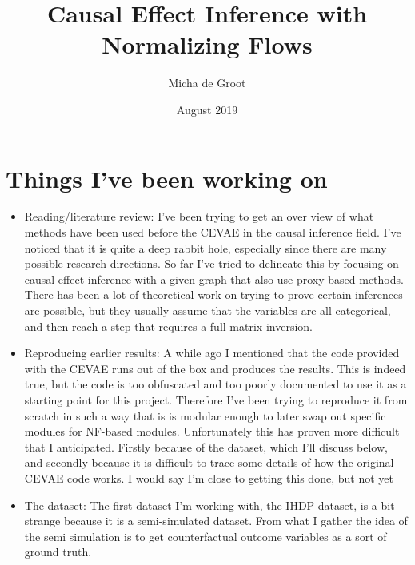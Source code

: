 \documentclass{article}
\title{Causal Effect Inference with Normalizing Flows}
\author{Micha de Groot}
\date{August 2019}
\begin{document}
\section*{Things I've been working on}
\begin{itemize}
    \item Reading/literature review: I've been trying to get an over view of what methods have been used before the CEVAE in the causal inference field. I've noticed that it is quite a deep rabbit hole, especially since there are many possible research directions. So far I've tried to delineate this by focusing on causal effect inference with a given graph that also use proxy-based methods. There has been a lot of theoretical work on trying to prove certain inferences are possible, but they usually assume that the variables are all categorical, and then reach a step that requires a full matrix inversion.
    \item Reproducing earlier results: A while ago I mentioned that the code provided with the CEVAE runs out of the box and produces the results. This is indeed true, but the code is too obfuscated and too poorly documented to use it as a starting point for this project. Therefore I've been trying to reproduce it from scratch in such a way that is is modular enough to later swap out specific modules for NF-based modules. Unfortunately this has proven more difficult that I anticipated. Firstly because of the dataset, which I'll discuss below, and secondly because it is difficult to trace some details of how the original CEVAE code works. I would say I'm close to getting this done, but not yet
    \item The dataset: The first dataset I'm working with, the IHDP dataset, is a bit strange because it is a semi-simulated dataset. From what I gather the idea of the semi simulation is to get counterfactual outcome variables as a sort of ground truth. 
\end{itemize}
\end{document}
